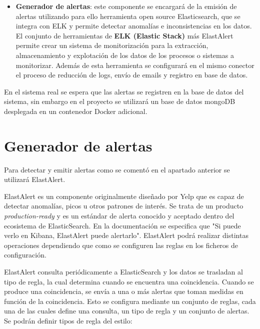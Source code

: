\begin{itemize}
\item \textbf{Generador de alertas}: este componente se encargará de la emisión de alertas utilizando para ello herramienta open source Elasticsearch, que se integra con ELK y permite detectar anomalías e inconsistencias en los datos. El conjunto de herramientas de \textbf{ELK (Elastic Stack)} más ElastAlert permite crear un sistema de monitorización para la extracción, almacenamiento y explotación de los datos de los procesos o sistemas a monitorizar. Además de esta herramienta se configurará en el mismo conector el proceso de reducción de logs, envío de emails y registro en base de datos.

\end{itemize}

En el sistema real se espera que las alertas se registren en la base de datos del sistema, sin embargo en el proyecto se utilizará un base de datos mongoDB desplegada en un contenedor Docker adicional.

\section{Generador de alertas}

Para detectar y emitir alertas como se comentó en el apartado anterior se utilizará ElastAlert.

ElastAlert es un componente originalmente diseñado por Yelp que es capaz de detectar anomalías, picos u otros patrones de interés. Se trata de un producto \textit{production-ready} y es un estándar de alerta conocido y aceptado dentro del ecosistema de ElasticSearch. En la documentación se especifica que "Si puede verlo en Kibana, ElastAlert puede alertarlo". ElastAlert podrá realizar distintas operaciones dependiendo que como se configuren las reglas en los ficheros de configuración. 

ElastAlert consulta periódicamente a ElasticSearch y los datos se trasladan al tipo de regla, la cual determina cuando se encuentra una coincidencia. Cuando se produce una coincidencia, se envía a una o más alertas que toman medidas en función de la coincidencia. Esto se configura mediante un conjunto de reglas, cada una de las cuales define una consulta, un tipo de regla y un conjunto de alertas. Se podrán definir tipos de regla del estilo:

